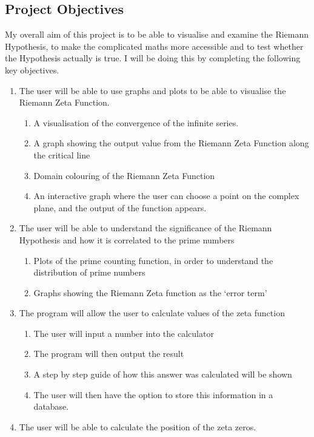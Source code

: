 \documentclass{article}
\begin{document}
\subsection{Project Objectives}
My overall aim of this project is to be able to visualise and examine the Riemann Hypothesis, to make the complicated maths more accessible and to test whether the Hypothesis actually is true. I will be doing this by completing the following key objectives.
\begin{enumerate}
    \item The user will be able to use graphs and plots to be able to visualise the Riemann Zeta Function.
    \begin{enumerate}
        \item A visualisation of the convergence of the infinite series.
        \item A graph showing the output value from the Riemann Zeta Function along the critical line
        \item Domain colouring of the Riemann Zeta Function
        \item An interactive graph where the user can choose a point on the complex plane, and the output of the function appears.
    \end{enumerate}
    \item The user will be able to understand the significance of the Riemann Hypothesis and how it is correlated to the prime numbers
    \begin{enumerate}
        \item Plots of the prime counting function, in order to understand the distribution of prime numbers
        \item Graphs showing the Riemann Zeta function as the ‘error term’
    \end{enumerate}
    \item The program will allow the user to calculate values of the zeta function
    \begin{enumerate}
        \item The user will input a number into the calculator
        \item The program will then output the result
        \item A step by step guide of how this answer was calculated will be shown
        \item The user will then have the option to store this information in a database.
    \end{enumerate}
    \item The user will be able to calculate the position of the zeta zeros.

\end{enumerate}
\end{document}
